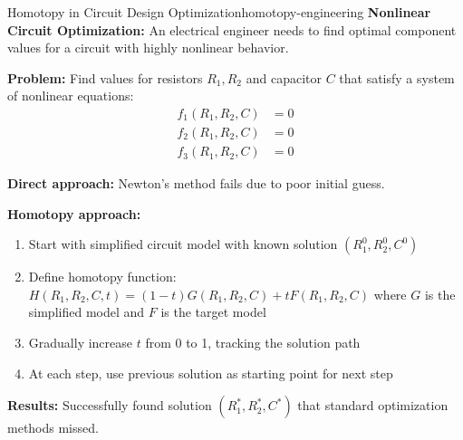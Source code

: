 \documentclass[12pt]{article}
\begin{document}
\begin{example}{Homotopy in Circuit Design Optimization}{homotopy-engineering}
\textbf{Nonlinear Circuit Optimization:} An electrical engineer needs to find optimal component values for a circuit with highly nonlinear behavior.

\textbf{Problem:} Find values for resistors $R_1, R_2$ and capacitor $C$ that satisfy a system of nonlinear equations:
\begin{align}
f_1(R_1, R_2, C) &= 0 \\
f_2(R_1, R_2, C) &= 0 \\
f_3(R_1, R_2, C) &= 0
\end{align}

\textbf{Direct approach:} Newton's method fails due to poor initial guess.

\textbf{Homotopy approach:}
\begin{enumerate}
    \item Start with simplified circuit model with known solution $(R_1^0, R_2^0, C^0)$
    \item Define homotopy function: $H(R_1, R_2, C, t) = (1-t)G(R_1, R_2, C) + tF(R_1, R_2, C)$
    where $G$ is the simplified model and $F$ is the target model
    \item Gradually increase $t$ from 0 to 1, tracking the solution path
    \item At each step, use previous solution as starting point for next step
\end{enumerate}

\textbf{Results:} Successfully found solution $(R_1^*, R_2^*, C^*)$ that standard optimization methods missed.

\begin{center}
\end{center}
\end{example}
\end{document}
